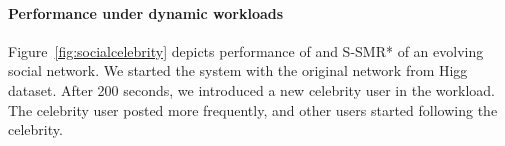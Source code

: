 


\paragraph*{Performance under dynamic workloads}

Figure~\ref{fig:socialcelebrity} depicts performance of \dynastar and S-SMR* of an evolving social network.  
We started the system with the original network from Higg dataset. After 200 seconds, we introduced a new celebrity user in the workload.
The celebrity user posted more frequently, and 
other users started following the celebrity. 

